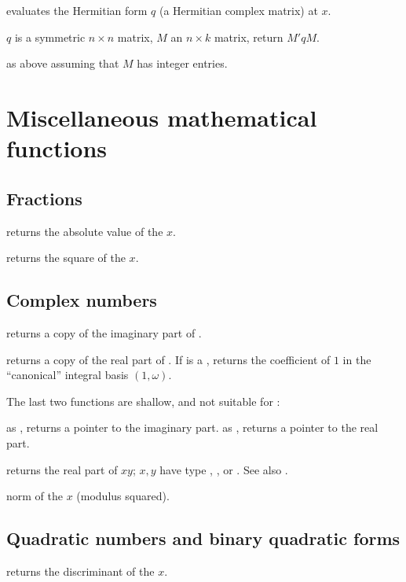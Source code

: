  evaluates the Hermitian form $q$
(a Hermitian complex matrix) at $x$.

 $q$ is a symmetric $n\times n$ matrix,
$M$ an $n\times k$ matrix, return $M' q M$.

 as above assuming that $M$ has integer
entries.

\newpage
\chapter{Miscellaneous mathematical functions}

\section{Fractions}

 returns the absolute value of the  $x$.

 returns the square of the  $x$.

\section{Complex numbers}

 returns a copy of the imaginary part of .

 returns a copy of the real part of . If 
is a , returns the coefficient of $1$ in the ``canonical'' integral
basis $(1,\omega)$.

The last two functions are shallow, and not suitable for :

 as , returns a pointer to the imaginary
part.
 as , returns a pointer to the real part.

 returns the real part of $xy$;
$x,y$ have type , ,  or . See also
.

 norm of the  $x$ (modulus squared).

\section{Quadratic numbers and binary quadratic forms}

 returns the discriminant of the  $x$.

